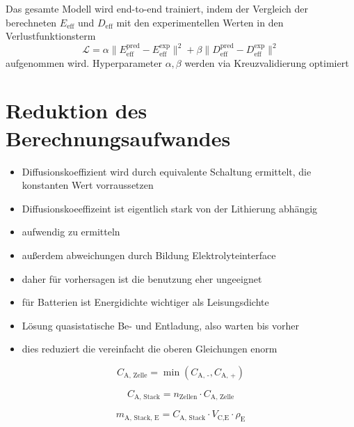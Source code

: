 Das gesamte Modell wird end-to-end trainiert, indem der Vergleich der berechneten $E_\mathrm{eff}$ und $D_\mathrm{eff}$ mit den experimentellen Werten in den Verlustfunktionsterm
\begin{equation}
    \mathcal{L} = \alpha \lVert E_\mathrm{eff}^\mathrm{pred} - E_\mathrm{eff}^\mathrm{exp}\rVert^2
+ \beta \lVert D_\mathrm{eff}^\mathrm{pred} - D_\mathrm{eff}^\mathrm{exp}\rVert^2
\end{equation}
aufgenommen wird. Hyperparameter $\alpha,\beta$ werden via Kreuzvalidierung optimiert %


\section{\label{sec:improve_elchem} Reduktion des Berechnungsaufwandes}
\begin{itemize}
    \item Diffusionskoeffizient wird durch equivalente Schaltung ermittelt, die konstanten Wert vorraussetzen
    \item Diffusionskoeeffizeint ist eigentlich stark von der Lithierung abhängig
    \item aufwendig zu ermitteln
    \item außerdem abweichungen durch Bildung Elektrolyteinterface
    \item daher für vorhersagen ist die benutzung eher ungeeignet
    \item für Batterien ist Energidichte wichtiger als Leisungsdichte
    \item Lösung quasistatische Be- und Entladung, also warten bis vorher
    \item dies reduziert die vereinfacht die oberen Gleichungen enorm
\end{itemize}

\begin{equation}
    C_{\text{A, Zelle}} = \min \left( C_{\text{A, -}} , C_{\text{A, +}}\right)
\end{equation}

\begin{equation}
    C_{\text{A, Stack}} = n_{\text{Zellen}} \cdot C_{\text{A, Zelle}}
\end{equation}

\begin{equation}
    m_{\text{A, Stack, E}} = C_{\text{A, Stack}} \cdot V_{\text{C,E}} \cdot \rho_{\text{E}}
\end{equation}

